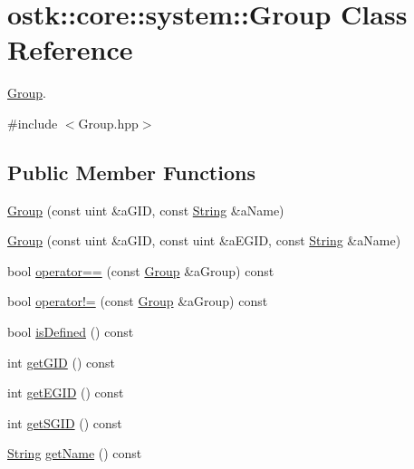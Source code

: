 \hypertarget{classostk_1_1core_1_1system_1_1_group}{}\section{ostk\+:\+:core\+:\+:system\+:\+:Group Class Reference}
\label{classostk_1_1core_1_1system_1_1_group}


\hyperlink{classostk_1_1core_1_1system_1_1_group}{Group}.  




{\ttfamily \#include $<$Group.\+hpp$>$}

\subsection*{Public Member Functions}
\begin{DoxyCompactItemize}
\item 
\hyperlink{classostk_1_1core_1_1system_1_1_group_a558bd46e1fdea8ee67ecd6643fd16ec4}{Group} (const uint \&a\+G\+ID, const \hyperlink{classostk_1_1core_1_1types_1_1_string}{String} \&a\+Name)
\item 
\hyperlink{classostk_1_1core_1_1system_1_1_group_a0fea739e63a33287a75d34304c4e1aa4}{Group} (const uint \&a\+G\+ID, const uint \&a\+E\+G\+ID, const \hyperlink{classostk_1_1core_1_1types_1_1_string}{String} \&a\+Name)
\item 
bool \hyperlink{classostk_1_1core_1_1system_1_1_group_aace16b5205f388ab389cd7ab14d2937b}{operator==} (const \hyperlink{classostk_1_1core_1_1system_1_1_group}{Group} \&a\+Group) const
\item 
bool \hyperlink{classostk_1_1core_1_1system_1_1_group_a053e176cea38e57bce0f69f72baed19b}{operator!=} (const \hyperlink{classostk_1_1core_1_1system_1_1_group}{Group} \&a\+Group) const
\item 
bool \hyperlink{classostk_1_1core_1_1system_1_1_group_a97f411cf741aca95c24120cea524f247}{is\+Defined} () const
\item 
int \hyperlink{classostk_1_1core_1_1system_1_1_group_a07b7056475b78fb83f34c7787cc52b8c}{get\+G\+ID} () const
\item 
int \hyperlink{classostk_1_1core_1_1system_1_1_group_a4a3d6eaf4892cd330be48522e38b41f1}{get\+E\+G\+ID} () const
\item 
int \hyperlink{classostk_1_1core_1_1system_1_1_group_aa4d1f37a36f78a14f67559e04de6f78c}{get\+S\+G\+ID} () const
\item 
\hyperlink{classostk_1_1core_1_1types_1_1_string}{String} \hyperlink{classostk_1_1core_1_1system_1_1_group_a53f316d03ebb745b3aecb3c535799829}{get\+Name} () const
\end{DoxyCompactItemize}
